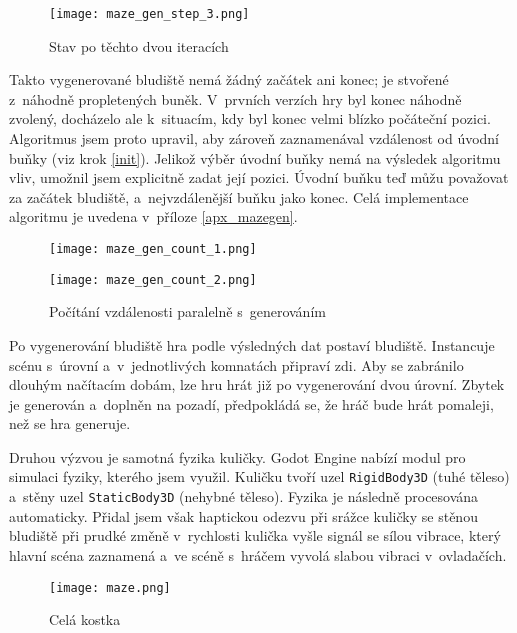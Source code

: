 \begin{figure}[H]
  \centering
  \texttt{[image: maze\_gen\_step\_3.png]}
  \caption{Stav po těchto dvou iteracích}
\end{figure}

Takto vygenerované bludiště nemá žádný začátek ani konec; je stvořené z~náhodně propletených buněk. V~prvních verzích hry byl konec náhodně zvolený, docházelo ale k~situacím, kdy byl konec velmi blízko počáteční pozici. Algoritmus jsem proto upravil, aby zároveň zaznamenával vzdálenost od úvodní buňky (viz krok \ref{init}). Jelikož výběr úvodní buňky nemá na výsledek algoritmu vliv, umožnil jsem explicitně zadat její pozici. Úvodní buňku teď můžu považovat za začátek bludiště, a~nejvzdálenější buňku jako konec. Celá implementace algoritmu je uvedena v~příloze \ref{apx_mazegen}.

\begin{figure}[H]
  \centering
  
  \begin{minipage}{.5\textwidth}
    \centering
    \texttt{[image: maze\_gen\_count\_1.png]}
  \end{minipage}%
  \begin{minipage}{.5\textwidth}
    \centering
    \texttt{[image: maze\_gen\_count\_2.png]}
  \end{minipage}
  
  \caption{Počítání vzdálenosti paralelně s~generováním}
\end{figure}

Po vygenerování bludiště hra podle výsledných dat postaví bludiště. Instancuje scénu s~úrovní a~v~jednotlivých komnatách připraví zdi. Aby se zabránilo dlouhým načítacím dobám, lze hru hrát již po vygenerování dvou úrovní. Zbytek je generován a~doplněn na pozadí, předpokládá se, že hráč bude hrát pomaleji, než se hra generuje.

Druhou výzvou je samotná fyzika kuličky. Godot Engine nabízí modul pro simulaci fyziky, kterého jsem využil. Kuličku tvoří uzel \texttt{RigidBody3D} (tuhé těleso) a~stěny uzel \texttt{StaticBody3D} (nehybné těleso). Fyzika je následně procesována automaticky. Přidal jsem však haptickou odezvu při srážce kuličky se stěnou bludiště \poml při prudké změně v~rychlosti kulička vyšle signál se sílou vibrace, který hlavní scéna zaznamená a~ve scéně s~hráčem vyvolá slabou vibraci v~ovladačích.

\begin{figure}[H]
  \centering
  \texttt{[image: maze.png]}
  \caption{Celá kostka}
  \label{maze_fig}
\end{figure}

